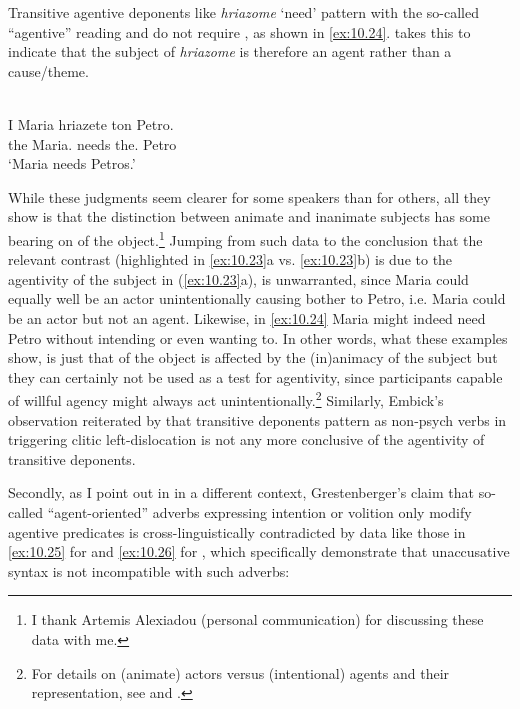 \documentclass[output=paper]{langsci/langscibook}
\begin{document}
Transitive agentive deponents like \emph{hriazome} ‘need’ pattern with the
so-called “agentive” reading and do not require , as shown in
\eqref{ex:10.24}. \citeauthor{Grestenberger2014} takes this to indicate that the subject of
\emph{hriazome} is therefore an agent rather than a cause/theme.

\ea\label{ex:10.24} \\
    \gll    I    Maria    hriazete  ton  Petro.\\
            the  Maria.\Nom{}  needs the.\Acc{}  Petro\\
    \glt    ‘Maria needs Petros.’
\z

While these judgments seem clearer for some  speakers than for others, all
they show is that the distinction between animate and inanimate subjects has
some bearing on  of the object.\footnote{I thank Artemis
Alexiadou (personal communication) for discussing these data with me.} Jumping
from such data to the conclusion that the relevant contrast (highlighted in
\ref{ex:10.23}a vs. \ref{ex:10.23}b) is due to the agentivity of
the subject in (\ref{ex:10.23}a), is unwarranted, since Maria could equally
well be an actor unintentionally causing bother to Petro, i.e. Maria could be
an actor but not an agent. Likewise, in \eqref{ex:10.24} Maria might indeed
need Petro without intending or even wanting to. In other words, what these
examples show, is just that  of the object is affected by the
(in)animacy of the subject but they can certainly not be used as a test for
agentivity, since participants capable of willful agency might always act
unintentionally.\footnote{For details on (animate) actors versus (intentional)
agents and their representation, see \citet{Demirdache1997} and
\textcite{Kallulli2006b,Kallulli2007}.}  Similarly, Embick’s observation
reiterated by \citeauthor{Grestenberger2014} that transitive deponents pattern as non-psych
verbs in triggering clitic left-dislocation is not
any more conclusive of the agentivity of transitive deponents.

Secondly, as I point out in \citet{Kallulli2007} in a different context,
Grestenberger’s claim that so-called “agent-oriented” adverbs expressing
intention or volition only modify agentive predicates is cross-linguistically
contradicted by data like those in \eqref{ex:10.25} for  and
\eqref{ex:10.26} for , which specifically demonstrate that
unaccusative
syntax is not incompatible with such adverbs:
\end{document}
